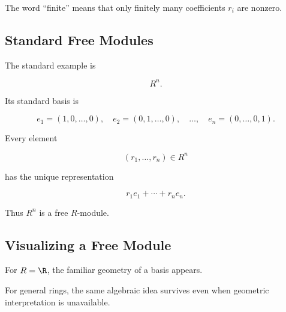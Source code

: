 The word ``finite'' means that only finitely many coefficients \(r_i\) are
nonzero.

\subsection{Standard Free Modules}
\label{subsec:standard-free-modules}

The standard example is

\[ R^n. \]

Its standard basis is

\[ e_1=(1,0,\ldots,0),\quad e_2=(0,1,\ldots,0),\quad\ldots,\quad e_n=(0,\ldots,0,1). \]

Every element

\[ (r_1,\ldots,r_n)\in R^n \]

has the unique representation

\[ r_1e_1+\cdots+r_ne_n. \]

Thus \(R^n\) is a free \(R\)-module.

\subsection{Visualizing a Free Module}
\label{subsec:free-module-visual}

For \(R=\R\), the familiar geometry of a basis appears.

\begin{center}
\end{center}

For general rings, the same algebraic idea survives even when geometric
interpretation is unavailable.

